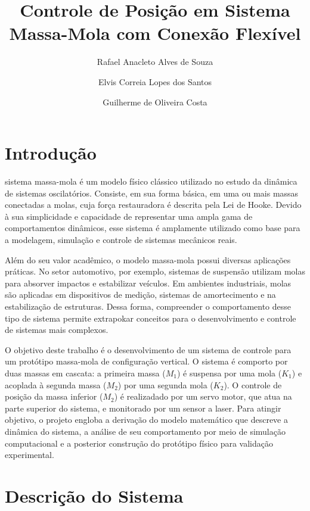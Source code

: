 \documentclass[9pt,a4paper,twocolumn,twoside]{tau-class/tau}
\title{Controle de Posição em Sistema Massa-Mola com Conexão Flexível}
\author[a,1]{Rafael Anacleto Alves de Souza}
\author[a,2]{Elvis Correia Lopes dos Santos}
\author[a,3]{Guilherme de Oliveira Costa}
\affil[a]{Instituto de Computação, Universidade Federal de Alagoas – Campus A.C. Simões\\
\textsuperscript{1}\texttt{raas@ic.ufal.br}, 
\textsuperscript{2}\texttt{ecls@ic.ufal.br}, 
\textsuperscript{3}\texttt{goc@ic.ufal.br}}
\begin{document}
		
    \maketitle 
    \thispagestyle{firststyle} 
    \tauabstract
    

\section{Introdução}

sistema massa-mola é um modelo físico clássico utilizado no estudo da dinâmica de sistemas oscilatórios. Consiste, em sua forma básica, em uma ou mais massas conectadas a molas, cuja força restauradora é descrita pela Lei de Hooke. Devido à sua simplicidade e capacidade de representar uma ampla gama de comportamentos dinâmicos, esse sistema é amplamente utilizado como base para a modelagem, simulação e controle de sistemas mecânicos reais.

Além do seu valor acadêmico, o modelo massa-mola possui diversas aplicações práticas. No setor automotivo, por exemplo, sistemas de suspensão utilizam molas para absorver impactos e estabilizar veículos. Em ambientes industriais, molas são aplicadas em dispositivos de medição, sistemas de amortecimento e na estabilização de estruturas. Dessa forma, compreender o comportamento desse tipo de sistema permite extrapokar conceitos para o desenvolvimento e controle de sistemas mais complexos.

O objetivo deste trabalho é o desenvolvimento de um sistema de controle para um protótipo massa-mola de configuração vertical. O sistema é comporto por duas massas em cascata: a primeira massa ($M_1$) é suspensa por uma mola ($K_1$) e acoplada à segunda massa ($M_2$) por uma segunda mola ($K_2$). O controle de posição da massa inferior ($M_2$) é realizadado por um servo motor, que atua na parte superior do sistema, e monitorado por um sensor a laser. Para atingir objetivo, o projeto engloba a derivação do modelo matemático que descreve a dinâmica do sistema, a análise de seu comportamento por meio de simulação computacional e a posterior construção do protótipo físico para validação experimental.

\section{Descrição do Sistema}
\end{document}
